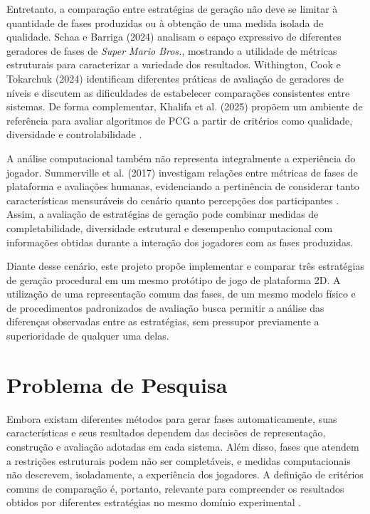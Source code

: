 Entretanto, a comparação entre estratégias de geração não deve se limitar à 
quantidade de fases produzidas ou à obtenção de uma medida isolada de 
qualidade. Schaa e Barriga (2024) analisam o espaço expressivo de diferentes 
geradores de fases de \textit{Super Mario Bros.}, mostrando a utilidade de 
métricas estruturais para caracterizar a variedade dos resultados. Withington, 
Cook e Tokarchuk (2024) identificam diferentes práticas de avaliação de 
geradores de níveis e discutem as dificuldades de estabelecer comparações 
consistentes entre sistemas. De forma complementar, Khalifa et al. (2025) 
propõem um ambiente de referência para avaliar algoritmos de PCG a partir 
de critérios como qualidade, diversidade e controlabilidade 
\cite{SchaaBarriga2024,Withington2024,Khalifa2025}.

A análise computacional também não representa integralmente a experiência do 
jogador. Summerville et al. (2017) investigam relações entre métricas de fases 
de plataforma e avaliações humanas, evidenciando a pertinência de considerar 
tanto características mensuráveis do cenário quanto percepções dos
participantes \cite{Summerville2017}. Assim, a avaliação de estratégias de 
geração pode combinar medidas de completabilidade, diversidade estrutural e 
desempenho computacional com informações obtidas durante a interação dos 
jogadores com as fases produzidas.

Diante desse cenário, este projeto propõe implementar e comparar três 
estratégias de geração procedural em um mesmo protótipo de jogo de plataforma 
2D. A utilização de uma representação comum das fases, de um mesmo modelo 
físico e de procedimentos padronizados de avaliação busca permitir a análise 
das diferenças observadas entre as estratégias, sem pressupor previamente a 
superioridade de qualquer uma delas.

\section{Problema de Pesquisa}

Embora existam diferentes métodos para gerar fases automaticamente, suas 
características e seus resultados dependem das decisões de representação, 
construção e avaliação adotadas em cada sistema. Além disso, fases que atendem 
a restrições estruturais podem não ser completáveis, e medidas computacionais 
não descrevem, isoladamente, a experiência dos jogadores. A definição de 
critérios comuns de comparação é, portanto, relevante para compreender os 
resultados obtidos por diferentes estratégias no mesmo domínio 
experimental \cite{Withington2024,Khalifa2025}.

